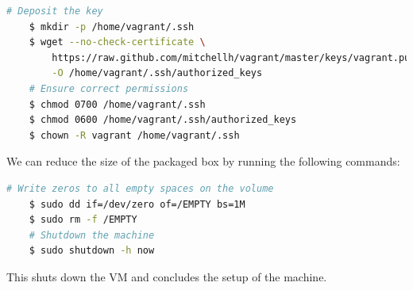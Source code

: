%
\vspace{0.2cm}\begin{lstlisting}[language=bash]
    # Deposit the key
    $ mkdir -p /home/vagrant/.ssh
    $ wget --no-check-certificate \
    	https://raw.github.com/mitchellh/vagrant/master/keys/vagrant.pub \
    	-O /home/vagrant/.ssh/authorized_keys
    # Ensure correct permissions
    $ chmod 0700 /home/vagrant/.ssh
    $ chmod 0600 /home/vagrant/.ssh/authorized_keys
    $ chown -R vagrant /home/vagrant/.ssh
\end{lstlisting}\vspace{0.2cm}
%
We can reduce the size of the packaged box by running the following commands:
%
\vspace{0.2cm}\begin{lstlisting}[language=bash]
    # Write zeros to all empty spaces on the volume
    $ sudo dd if=/dev/zero of=/EMPTY bs=1M
    $ sudo rm -f /EMPTY
    # Shutdown the machine
    $ sudo shutdown -h now
\end{lstlisting}\vspace{0.2cm}
%
This shuts down the VM and concludes the setup of the machine. 
